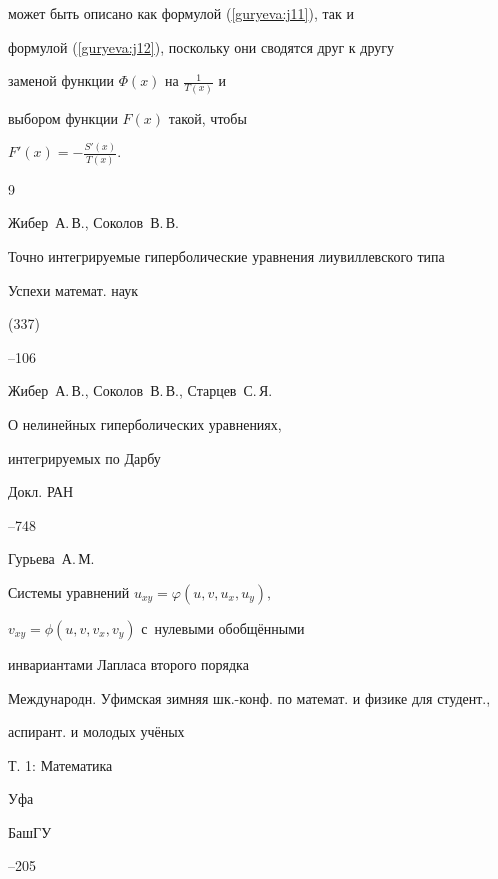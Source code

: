 может быть описано как формулой (\ref{guryeva:j11}), так и


формулой (\ref{guryeva:j12}), поскольку они сводятся  друг к другу


заменой функции $ \Phi(x)$ на $ \frac{1}{T(x)}$ и


выбором функции $ F(x) $ такой, чтобы


$F'(x)=- \frac{S'(x)}{T(x)}.$














\begin{thebibliography}{9}


 \RBibitem{[1.]}


\by Жибер~А.\,В., Соколов~В.\,В.


\paper Точно интегрируемые гиперболические уравнения лиувиллевского типа


\jour  Успехи математ. наук






(337)


--106





 \RBibitem{[2.]}


\by Жибер~А.\,В., Соколов~В.\,В., Старцев~С.\,Я.


\paper О нелинейных гиперболических уравнениях,


 интегрируемых по Дарбу


\jour Докл. РАН








--748








 \RBibitem{[3.]}


\by Гурьева~А.\,М.


\paper Системы уравнений  $u_{xy}=\varphi(u, v, u_{x}, u_{y}),$


$ v_{xy}=\phi(u, v, v_{x}, v_{y}) $ с~нулевыми обобщёнными


инвариантами Лапласа второго порядка


\inbook Международн. Уфимская зимняя  шк.-конф. по математ. и физике для студент.,


аспирант. и молодых учёных


\bookinfo  Т. 1: Математика


\publaddr Уфа


\publ БашГУ




--205








\end{thebibliography}





\makeengtitlem


\lfoot[\thepage]{}


\rfoot[]{\thepage}





%


% 


